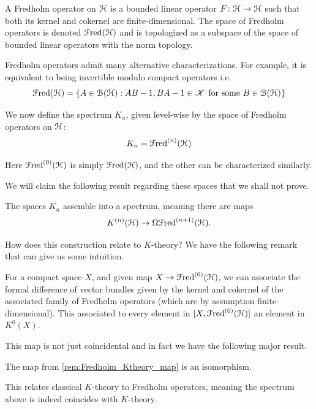 \documentclass[10pt]{amsart}
\begin{document}
\begin{definition}
	A Fredholm operator on $\mathcal{H}$ is a bounded linear operator $F \colon \mathcal{H} \to \mathcal{H}$ such that both its kernel and cokernel are finite-dimensional. The space of Fredholm operators is denoted $\mathcal{F}\mathrm{red}(\mathcal{H})$ and is topologized as a subspace of the space of bounded linear operators with the norm topology.
\end{definition}

\begin{remark}
Fredholm operators admit many alternative characterizations. For example, it is equivalent to being invertible modulo compact operators i.e. 
\[\mathcal{F}\mathrm{red}(\mathcal{H}) = \{A \in \mathcal{B}(\mathcal{H}) : AB - 1, BA - 1 \in \mathscr{K} \text{ for some } B \in \mathcal{B}(\mathcal{H})\} \]
\end{remark}

We now define the spectrum $K_n$, given level-wise by the space of Fredholm operators on $\mathcal{H}$:
\[ K_n = \mathcal{F}\mathrm{red}^{(n)}(\mathcal{H})\]

Here $\mathcal{F}\mathrm{red}^{(0)}(\mathcal{H})$ is simply $\mathcal{F}\mathrm{red}(\mathcal{H})$, and the other can be characterized similarly.

We will claim the following result regarding these spaces that we shall not prove.

\begin{lemma}
 The spaces $K_n$ assemble into a spectrum, meaning there are maps
	\[ K^{(n)}(\mathcal{H}) \to \Omega \mathcal{F}\mathrm{red}^{(n+1)}(\mathcal{H}). \]
\end{lemma}

How does this construction relate to $K$-theory? We have the following remark that can give us some intuition.

\begin{remark} \label{rem:Fredholm_Ktheory_map}
 For a compact space $X$, and given map $X \to \mathcal{F}\mathrm{red}^{(0)}(\mathcal{H})$, we can associate the formal difference of vector bundles given by the kernel and cokernel of the associated family of Fredholm operators (which are by assumption finite-dimensional). This associated to every element in $[X,\mathcal{F}\mathrm{red}^{(0)}(\mathcal{H})]$ an element in $K^0(X)$. 
\end{remark}

This map is not just coincidental and in fact we have the following major result.

\begin{theorem}
 The map from \cref{rem:Fredholm_Ktheory_map} is an isomorphism.
\end{theorem}

This relates classical $K$-theory to Fredholm operators, meaning the spectrum above is indeed coincides with $K$-theory.
\end{document}
